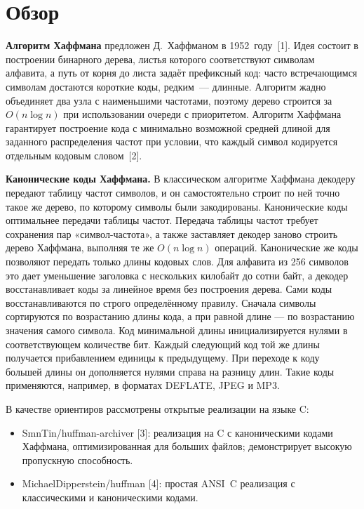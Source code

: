 \documentclass[a4paper]{article}
\begin{document}
\section{Обзор}

\textbf{Алгоритм Хаффмана} предложен Д.~Хаффманом в 1952~году~[1].
Идея состоит в построении бинарного дерева, листья которого
соответствуют символам алфавита, а путь от корня до листа задаёт
префиксный код: часто встречающимся символам достаются короткие
коды, редким~--- длинные. Алгоритм жадно объединяет два узла
с наименьшими частотами, поэтому дерево строится за
$O(n \log n)$ при использовании очереди с приоритетом. Алгоритм Хаффмана гарантирует построение кода с минимально возможной средней длиной для заданного распределения частот при условии, что каждый символ кодируется отдельным кодовым словом~[2].

\textbf{Канонические коды Хаффмана.}
В классическом алгоритме Хаффмана декодеру передают таблицу частот символов, и он самостоятельно строит по ней точно такое же дерево, по которому символы были закодированы.
Канонические коды оптимальнее передачи таблицы частот. Передача таблицы частот требует сохранения пар «символ-частота», а также заставляет декодер заново строить дерево Хаффмана, выполняя те же $O(n \log n)$ операций. Канонические же коды позволяют передать только длины кодовых слов. Для алфавита из 256 символов это дает уменьшение заголовка с нескольких килобайт до сотни байт, а декодер восстанавливает коды за линейное время без построения дерева.
Сами коды восстанавливаются по строго определённому правилу. Сначала символы сортируются по возрастанию длины кода, а при равной длине — по возрастанию значения самого символа. Код минимальной длины инициализируется нулями в соответствующем количестве бит. Каждый следующий код той же длины получается прибавлением единицы к предыдущему. При переходе к коду большей длины он дополняется нулями справа на разницу длин.
Такие коды применяются, например, в форматах DEFLATE, JPEG и MP3.

В качестве ориентиров рассмотрены открытые реализации на языке C:

\begin{itemize}
    \item SmnTin/huffman-archiver [3]: реализация на C с каноническими кодами Хаффмана, оптимизированная для больших файлов; демонстрирует высокую пропускную способность.
    \item MichaelDipperstein/huffman [4]: простая ANSI~C реализация с классическими и каноническими кодами.
\end{itemize}
\end{document}
